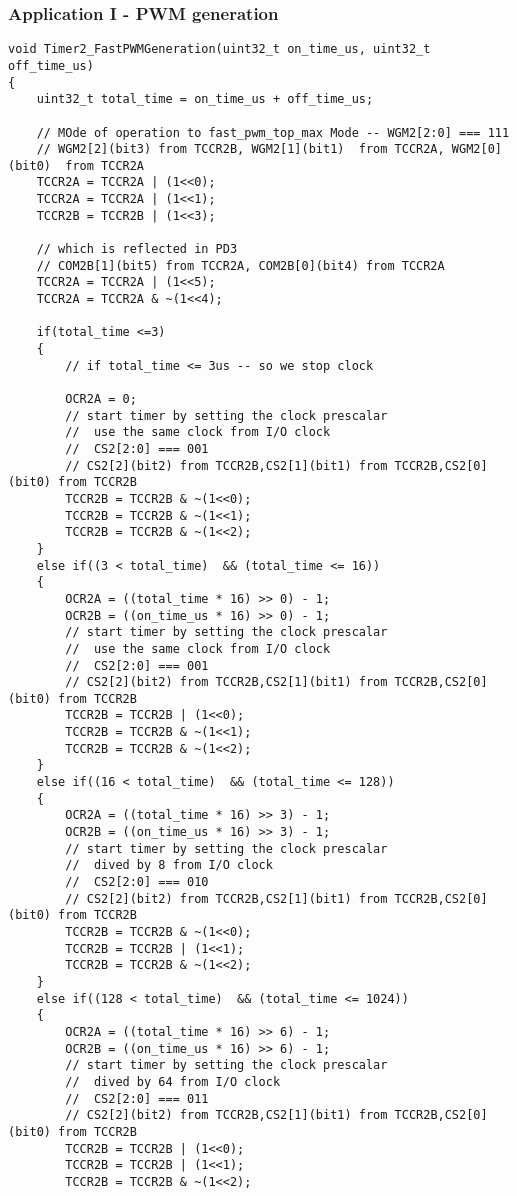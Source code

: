 \subsubsection{Application I - PWM generation}
\begin{verbatim}
void Timer2_FastPWMGeneration(uint32_t on_time_us, uint32_t off_time_us)
{
	uint32_t total_time = on_time_us + off_time_us;
		
	// MOde of operation to fast_pwm_top_max Mode -- WGM2[2:0] === 111
	// WGM2[2](bit3) from TCCR2B, WGM2[1](bit1)  from TCCR2A, WGM2[0](bit0)  from TCCR2A
	TCCR2A = TCCR2A | (1<<0);
	TCCR2A = TCCR2A | (1<<1);
	TCCR2B = TCCR2B | (1<<3);	

	// which is reflected in PD3
	// COM2B[1](bit5) from TCCR2A, COM2B[0](bit4) from TCCR2A
	TCCR2A = TCCR2A | (1<<5);
	TCCR2A = TCCR2A & ~(1<<4);
	
	if(total_time <=3)
	{
		// if total_time <= 3us -- so we stop clock
		
		OCR2A = 0;
		// start timer by setting the clock prescalar
		//  use the same clock from I/O clock
		//  CS2[2:0] === 001
		// CS2[2](bit2) from TCCR2B,CS2[1](bit1) from TCCR2B,CS2[0](bit0) from TCCR2B
		TCCR2B = TCCR2B & ~(1<<0);
		TCCR2B = TCCR2B & ~(1<<1);
		TCCR2B = TCCR2B & ~(1<<2);
	}
	else if((3 < total_time)  && (total_time <= 16))
	{
		OCR2A = ((total_time * 16) >> 0) - 1;
		OCR2B = ((on_time_us * 16) >> 0) - 1;
		// start timer by setting the clock prescalar
		//  use the same clock from I/O clock
		//  CS2[2:0] === 001
		// CS2[2](bit2) from TCCR2B,CS2[1](bit1) from TCCR2B,CS2[0](bit0) from TCCR2B
		TCCR2B = TCCR2B | (1<<0);
		TCCR2B = TCCR2B & ~(1<<1);
		TCCR2B = TCCR2B & ~(1<<2);
	}
	else if((16 < total_time)  && (total_time <= 128))
	{
		OCR2A = ((total_time * 16) >> 3) - 1;
		OCR2B = ((on_time_us * 16) >> 3) - 1;
		// start timer by setting the clock prescalar
		//  dived by 8 from I/O clock
		//  CS2[2:0] === 010
		// CS2[2](bit2) from TCCR2B,CS2[1](bit1) from TCCR2B,CS2[0](bit0) from TCCR2B
		TCCR2B = TCCR2B & ~(1<<0);
		TCCR2B = TCCR2B | (1<<1);
		TCCR2B = TCCR2B & ~(1<<2);
	}
	else if((128 < total_time)  && (total_time <= 1024))
	{
		OCR2A = ((total_time * 16) >> 6) - 1;
		OCR2B = ((on_time_us * 16) >> 6) - 1;
		// start timer by setting the clock prescalar
		//  dived by 64 from I/O clock
		//  CS2[2:0] === 011
		// CS2[2](bit2) from TCCR2B,CS2[1](bit1) from TCCR2B,CS2[0](bit0) from TCCR2B
		TCCR2B = TCCR2B | (1<<0);
		TCCR2B = TCCR2B | (1<<1);
		TCCR2B = TCCR2B & ~(1<<2);
		

\end{verbatim}
